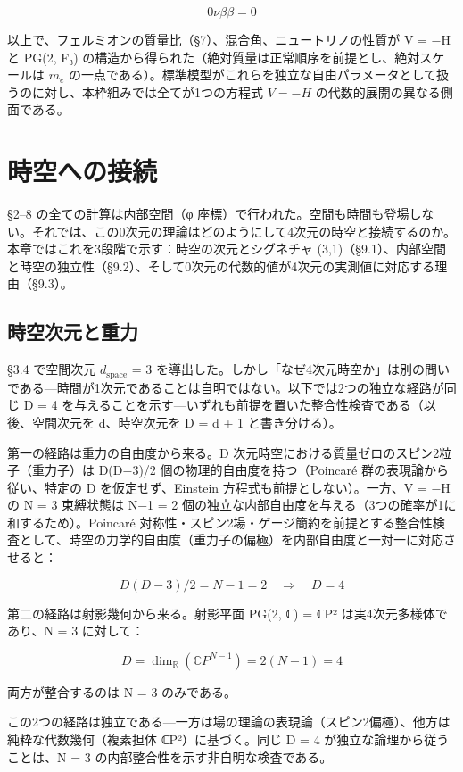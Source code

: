 \documentclass[fontsize=11pt,paper=a4,lualatex]{jlreq}
\begin{document}
\[0\nu\beta\beta = 0\]


以上で、フェルミオンの質量比（§7）、混合角、ニュートリノの性質が V = −H と PG(2, F₃) の構造から得られた（絶対質量は正常順序を前提とし、絶対スケールは $m_e$ の一点である）。標準模型がこれらを独立な自由パラメータとして扱うのに対し、本枠組みでは全てが1つの方程式 $V = -H$ の代数的展開の異なる側面である。

\section{時空への接続}\label{ux6642ux7a7aux3078ux306eux63a5ux7d9a}

§2--8 の全ての計算は内部空間（φ
座標）で行われた。空間も時間も登場しない。それでは、この0次元の理論はどのようにして4次元の時空と接続するのか。本章ではこれを3段階で示す：時空の次元とシグネチャ (3,1)（§9.1）、内部空間と時空の独立性（§9.2）、そして0次元の代数的値が4次元の実測値に対応する理由（§9.3）。

\subsection{時空次元と重力}\label{ux6642ux7a7aux6b21ux5143ux3068ux91cdux529b}

§3.4 で空間次元 $d_{\mathrm{space}}$ = 3
を導出した。しかし「なぜ4次元時空か」は別の問いである---時間が1次元であることは自明ではない。以下では2つの独立な経路が同じ D = 4 を与えることを示す---いずれも前提を置いた整合性検査である（以後、空間次元を d、時空次元を D = d + 1 と書き分ける）。

第一の経路は重力の自由度から来る。D 次元時空における質量ゼロのスピン2粒子（重力子）は D(D−3)/2 個の物理的自由度を持つ（Poincaré 群の表現論から従い、特定の D を仮定せず、Einstein 方程式も前提としない）。一方、V = −H の N = 3 束縛状態は N−1 = 2 個の独立な内部自由度を与える（3つの確率が1に和するため）。Poincaré 対称性・スピン2場・ゲージ簡約を前提とする整合性検査として、時空の力学的自由度（重力子の偏極）を内部自由度と一対一に対応させると：

\[D(D−3)/2 = N − 1 = 2 \quad \Longrightarrow \quad D = 4\]

第二の経路は射影幾何から来る。射影平面 PG(2, ℂ) = ℂP² は実4次元多様体であり、N = 3 に対して：

\[D = \dim_\mathbb{R}(\mathbb{C}P^{N-1}) = 2(N-1) = 4\]

両方が整合するのは N = 3 のみである。

この2つの経路は独立である---一方は場の理論の表現論（スピン2偏極）、他方は純粋な代数幾何（複素担体 ℂP²）に基づく。同じ D = 4 が独立な論理から従うことは、N = 3 の内部整合性を示す非自明な検査である。
\end{document}
